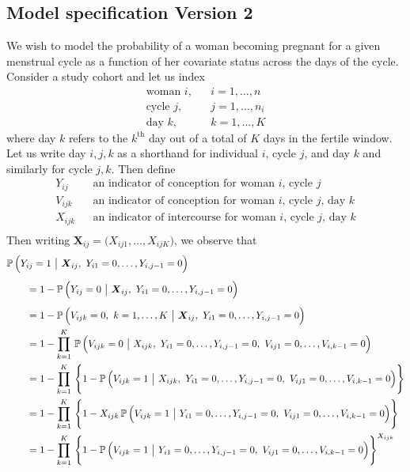 \documentclass[11pt]{article}
\newcommand{\prob}{\mathbb{P}\,}
\renewcommand{\vec}{\boldsymbol}
\newcommand{\barM}{~\big|~}
\begin{document}
\subsection{Model specification Version 2}
We wish to model the probability of a woman becoming pregnant for a given menstrual cycle as a function of her covariate status across the days of the cycle.  Consider a study cohort and let us index
\[ \begin{array}{lll}
\text{woman } i, & & i = 1,\dots,n   \\[1ex]
\text{cycle } j, & & j = 1,\dots,n_i \\[1ex]
\text{day }   k, & & k = 1,\dots,K
\end{array} \]
where day $k$ refers to the $k^\text{th}$ day out of a total of $K$ days in the fertile window.  Let us write day $i,j,k$ as a shorthand for individual $i$, cycle $j$, and day $k$ and similarly for cycle $j,k$.  Then define
\[ \begin{array}{lll}
Y_{ij} & & \text{an indicator of conception for woman $i$, cycle $j$} \\[1ex]
V_{ijk} & & \text{an indicator of conception for woman $i$, cycle $j$, day $k$} \\[1ex]
X_{ijk} & & \text{an indicator of intercourse for woman $i$, cycle $j$, day $k$} \\[1ex]
\end{array}  \]
Then writing $\vec{X}_{ij} = \big( X_{ij1}, \dots, X_{ijK} \big)$, we observe that
\begin{align*} \MoveEqLeft
\prob\Big( Y_{ij} = 1 \barM \vec{X}_{ij},~ Y_{i1} = 0,\dots, Y_{i,j-1} = 0  \Big) \\[1ex]
&= 1 - \prob\Big( Y_{ij} = 0 \barM \vec{X}_{ij},~ Y_{i1} = 0,\dots, Y_{i,j-1} = 0 \Big) \\[1ex]
&= 1 - \prob\Big( V_{ijk} = 0,~ k=1,\dots,K \barM \vec{X}_{ij},~ Y_{i1} = 0,\dots, Y_{i,j-1} = 0 \Big) \\
&= 1 - \prod_{k=1}^K\, \prob\Big( V_{ijk} = 0 \barM X_{ijk},~ Y_{i1} = 0,\dots, Y_{i,j-1} = 0,~ V_{ij1} = 0, \dots, V_{i,k-1} = 0 \Big) \\
&= 1 - \prod_{k=1}^K\, \Bigg\{ 1 - \prob\Big( V_{ijk} = 1 \barM X_{ijk},~ Y_{i1} = 0,\dots, Y_{i,j-1} = 0,~ V_{ij1} = 0, \dots, V_{i,k-1} = 0 \Big) \Bigg\} \\
&= 1 - \prod_{k=1}^K\, \Bigg\{ 1 - X_{ijk}\, \prob\Big( V_{ijk} = 1 \barM Y_{i1} = 0,\dots, Y_{i,j-1} = 0,~ V_{ij1} = 0, \dots, V_{i,k-1} = 0 \Big) \Bigg\} \\
&= 1 - \prod_{k=1}^K\, \Bigg\{ 1 - \prob\Big( V_{ijk} = 1 \barM Y_{i1} = 0,\dots, Y_{i,j-1} = 0,~ V_{ij1} = 0, \dots, V_{i,k-1} = 0 \Big) \Bigg\}^{X_{ijk}} \\
\end{align*}
\end{document}
